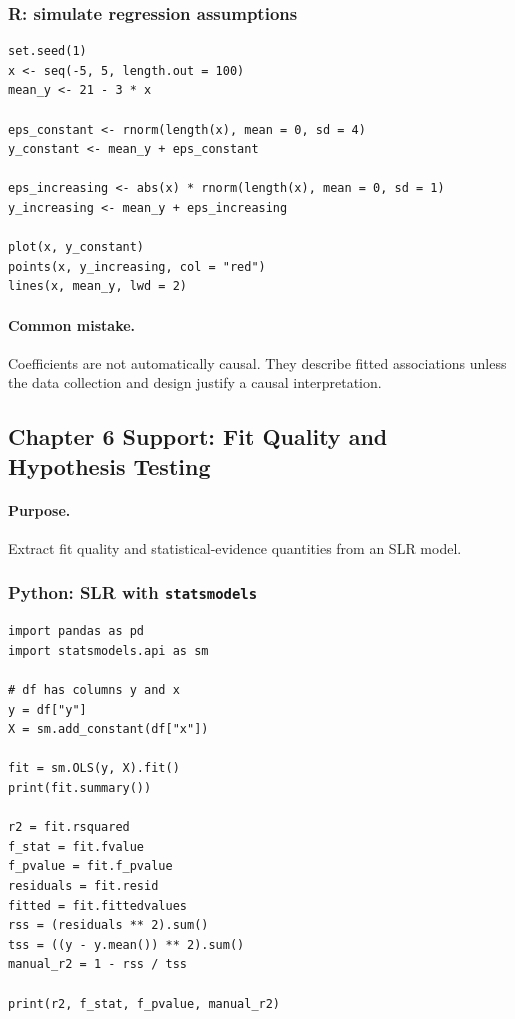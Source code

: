 \subsubsection*{R: simulate regression assumptions}

\begin{verbatim}
set.seed(1)
x <- seq(-5, 5, length.out = 100)
mean_y <- 21 - 3 * x

eps_constant <- rnorm(length(x), mean = 0, sd = 4)
y_constant <- mean_y + eps_constant

eps_increasing <- abs(x) * rnorm(length(x), mean = 0, sd = 1)
y_increasing <- mean_y + eps_increasing

plot(x, y_constant)
points(x, y_increasing, col = "red")
lines(x, mean_y, lwd = 2)
\end{verbatim}

\paragraph{Common mistake.} Coefficients are not automatically causal.  They describe fitted associations unless the data collection and design justify a causal interpretation.

\subsection{Chapter 6 Support: Fit Quality and Hypothesis Testing}
\label{app:ch06-software-cookbook-fit-quality-and-hypothesis-testing}

\paragraph{Purpose.} Extract fit quality and statistical-evidence quantities from an SLR model.

\subsubsection*{Python: SLR with \texttt{statsmodels}}

\begin{verbatim}
import pandas as pd
import statsmodels.api as sm

# df has columns y and x
y = df["y"]
X = sm.add_constant(df["x"])

fit = sm.OLS(y, X).fit()
print(fit.summary())

r2 = fit.rsquared
f_stat = fit.fvalue
f_pvalue = fit.f_pvalue
residuals = fit.resid
fitted = fit.fittedvalues
rss = (residuals ** 2).sum()
tss = ((y - y.mean()) ** 2).sum()
manual_r2 = 1 - rss / tss

print(r2, f_stat, f_pvalue, manual_r2)
\end{verbatim}

